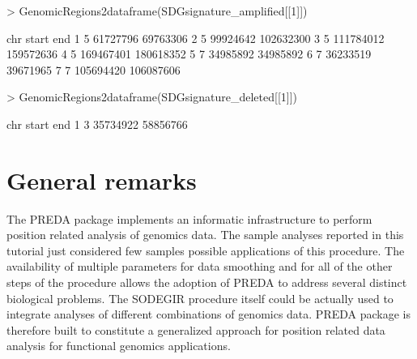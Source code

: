 \documentclass[a4paper,10pt]{article}
\begin{document}
\begin{Schunk}
\begin{Sinput}
> GenomicRegions2dataframe(SDGsignature_amplified[[1]])
\end{Sinput}
\begin{Soutput}
  chr     start       end
1   5  61727796  69763306
2   5  99924642 102632300
3   5 111784012 159572636
4   5 169467401 180618352
5   7  34985892  34985892
6   7  36233519  39671965
7   7 105694420 106087606
\end{Soutput}
\begin{Sinput}
> GenomicRegions2dataframe(SDGsignature_deleted[[1]])
\end{Sinput}
\begin{Soutput}
  chr    start      end
1   3 35734922 58856766
\end{Soutput}
\end{Schunk}

\section{General remarks}
The PREDA package implements an informatic infrastructure to perform position related analysis of genomics data. The sample analyses reported in this tutorial just considered few samples possible applications of this procedure. The availability of multiple parameters for data smoothing and for all of the other steps of the procedure allows the adoption of PREDA to address several distinct biological problems. The SODEGIR procedure itself could be actually used to integrate analyses of different combinations of genomics data. PREDA package is therefore built to constitute a generalized approach for position related data analysis for functional genomics applications.


\newpage
{}


\end{document}
